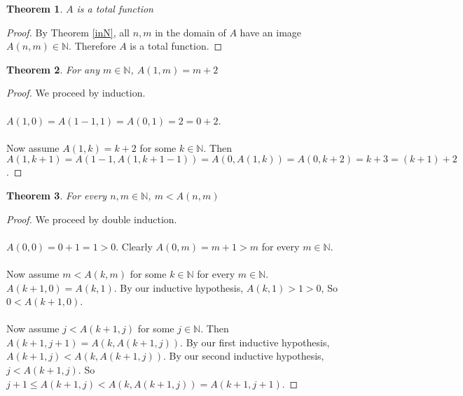 \documentclass[12pt, letterpaper]{article}
\newtheorem{theorem}{Theorem}
\theoremstyle{case}
\begin{document}
    \begin{theorem}
      $A$ is a total function
    \end{theorem}
    \begin{proof}
      By Theorem \ref{inN}, all $n, m$ in the domain of $A$ have an image $A(n, m) \in \mathbb{N}$.
      Therefore $A$ is a total function.
    \end{proof}

    \begin{theorem}
      \label{x+2=A(1,x)}
      For any $m \in \mathbb{N}$, $A(1, m) = m + 2$
    \end{theorem}
    \begin{proof}
      We proceed by induction.
      \\
      \\
      $A(1, 0) = A(1 - 1, 1) = A(0, 1) = 2 = 0 + 2$.
      \\
      \\
      Now assume $A(1, k) = k + 2$ for some $k \in \mathbb{N}$.
      Then $A(1, k + 1) = A(1 - 1, A(1, k + 1 - 1)) = A(0, A(1, k)) = A(0, k + 2) = k + 3 = (k + 1) + 2$.
    \end{proof}

    \begin{theorem}
      \label{m<A(n,m)}
      For every $n, m \in \mathbb{N}$, $m < A(n, m)$
    \end{theorem}
    \begin{proof}
      We proceed by double induction.
      \\
      \\
      $A(0, 0) = 0 + 1 = 1 > 0$.
      Clearly $A(0, m) = m + 1 > m$ for every $m \in \mathbb{N}$.
      \\
      \\
      Now assume $m < A(k, m)$ for some $k \in \mathbb{N}$ for every $m \in \mathbb{N}$.
      $A(k + 1, 0) = A(k, 1)$. By our inductive hypothesis, $A(k, 1) > 1 > 0$,
      So $0 < A(k + 1, 0)$.
      \\
      \\
      Now assume $j < A(k + 1, j)$ for some $j \in \mathbb{N}$.
      Then $A(k + 1, j + 1) = A(k, A(k + 1, j))$.
      By our first inductive hypothesis, $A(k + 1, j) < A(k, A(k + 1, j))$.
      By our second inductive hypothesis, $j < A(k + 1, j)$.
      So $j + 1 \leq A(k + 1, j) < A(k, A(k + 1, j)) = A(k + 1, j + 1)$.
    \end{proof}
\end{document}
